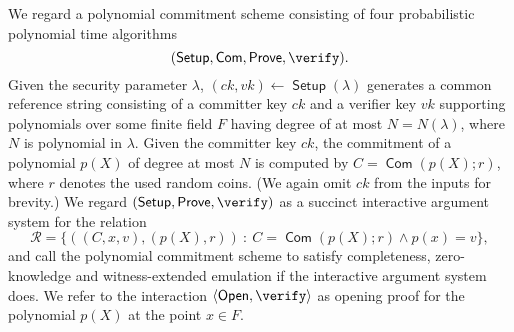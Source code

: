 \documentclass[10pt,article,oneside]{memoir}
\theoremstyle{definition}
\newtheorem{defn}[thm]{Definition}
\theoremstyle{remark}
\DeclareMathOperator{\setup}{\mathsf{Setup}}
\DeclareMathOperator{\comm}{\mathsf{Com}}
\DeclareMathOperator{\open}{\mathsf{Open}}
\DeclareMathOperator{\prove}{\mathsf{Prove}}
\begin{document}


We regard a polynomial commitment scheme consisting of four probabilistic polynomial time algorithms 
\[
(\setup, \comm, \prove, \verify).
\]
Given the security parameter $\lambda$, $(ck,vk)\leftarrow\setup(\lambda)$ generates a common reference string consisting of a committer key $ck$ and a verifier key $vk$ supporting polynomials over some finite field $F$ having degree of at most $N=N(\lambda)$, where $N$ is polynomial in $\lambda$. 
Given the committer key $ck$, the commitment of a polynomial $p(X)$ of degree at most $N$ is computed by $C=\comm(p(X); r)$, where $r$ denotes the used random coins.
(We again omit $ck$ from the inputs for brevity.)
We regard $(\setup,\prove,\verify)$ as a succinct interactive argument system for the relation
\[
\mathcal R = \big\{
    ((C,x,v),(p(X),r)) ~:~ C=\comm(p(X);r) \wedge p(x) = v
\big\},
\]
and call the polynomial commitment scheme to satisfy completeness, zero-knowledge and witness-extended emulation if the interactive argument system does.
We refer to the interaction $\langle \open,\verify\rangle$ as opening proof for the polynomial $p(X)$ at the point $x\in F$. 
\end{document}
